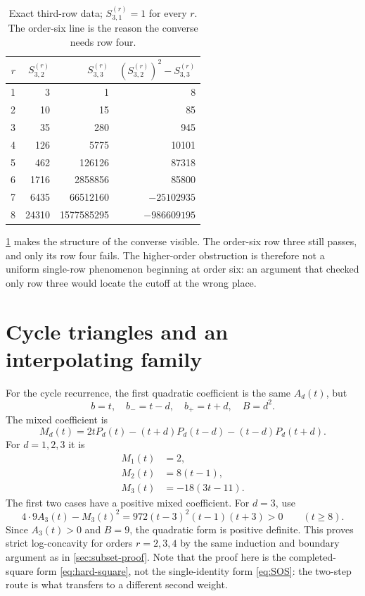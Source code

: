 \documentclass[11pt,a4paper]{article}
\numberwithin{equation}{section}
\theoremstyle{definition}
\theoremstyle{remark}
\begin{document}
\begin{table}[htbp]
\centering
\small
\renewcommand{\arraystretch}{1.2}
\begin{tabular}{rrrr}
\toprule
$r$ & $S^{(r)}_{3,2}$ & $S^{(r)}_{3,3}$ &
$(S^{(r)}_{3,2})^2-S^{(r)}_{3,3}$\\
\midrule
1 & 3 & 1 & 8\\
2 & 10 & 15 & 85\\
3 & 35 & 280 & 945\\
4 & 126 & 5775 & 10101\\
5 & 462 & 126126 & 87318\\
6 & 1716 & 2858856 & 85800\\
7 & 6435 & 66512160 & $-25102935$\\
8 & 24310 & 1577585295 & $-986609195$\\
\bottomrule
\end{tabular}
\caption{Exact third-row data; $S^{(r)}_{3,1}=1$ for every $r$.
The order-six line is the reason the converse needs row four.}
\label{tab:third}
\end{table}

\cref{tab:third} makes the structure of the converse visible. The
order-six row three still passes, and only its row four fails. The
higher-order obstruction is therefore not a uniform single-row phenomenon
beginning at order six: an argument that checked only row three would
locate the cutoff at the wrong place.

\section{Cycle triangles and an interpolating family}\label{sec:cycle-proof}

For the cycle recurrence, the first quadratic coefficient is the same
$A_d(t)$, but
\[
 b=t,\quad b_-=t-d,\quad b_+=t+d,\quad B=d^2.
\]
The mixed coefficient is
\begin{equation}\label{eq:Md}
 M_d(t)=2tP_d(t)-(t+d)P_d(t-d)-(t-d)P_d(t+d).
\end{equation}
For $d=1,2,3$ it is
\begin{align}
 M_1(t)&=2,\label{eq:M1}\\
 M_2(t)&=8(t-1),\label{eq:M2}\\
 M_3(t)&=-18(3t-11).\label{eq:M3}
\end{align}
The first two cases have a positive mixed coefficient. For $d=3$, use
\begin{equation}\label{eq:cycle4-discriminant}
 4\cdot9A_3(t)-M_3(t)^2
      =972(t-3)^2(t-1)(t+3)>0\qquad(t\ge8).
\end{equation}
Since $A_3(t)>0$ and $B=9$, the quadratic form is positive definite.
This proves strict log-concavity for orders $r=2,3,4$ by the same induction
and boundary argument as in \cref{sec:subset-proof}. Note that the proof
here is the completed-square form \eqref{eq:hard-square}, not the
single-identity form \eqref{eq:SOS}: the two-step route is what transfers
to a different second weight.
\end{document}
